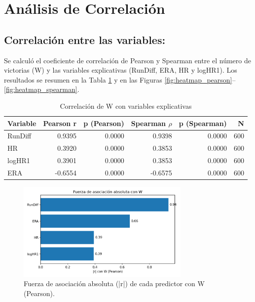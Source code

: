 \documentclass[10pt]{article}
\begin{document}
\section{Análisis de Correlación}
\subsection{Correlación entre las variables:}

Se calculó el coeficiente de correlación de Pearson y Spearman entre el número de victorias (W) y las variables explicativas 
(RunDiff, ERA, HR y logHR1). Los resultados se resumen en la Tabla \ref{tab:corr_w_x} y en las Figuras 
\ref{fig:heatmap_pearson}--\ref{fig:heatmap_spearman}.

\begin{table}[H]
    \centering
    \caption{Correlación de W con variables explicativas}
    \label{tab:corr_w_x}
    \begin{tabular}{lrrrrr}
    \toprule
    Variable & Pearson r & p (Pearson) & Spearman $\rho$ & p (Spearman) & N \\
    \midrule
    RunDiff & 0.9395 & 0.0000 & 0.9398 & 0.0000 & 600 \\
    HR & 0.3920 & 0.0000 & 0.3853 & 0.0000 & 600 \\
    logHR1 & 0.3901 & 0.0000 & 0.3853 & 0.0000 & 600 \\
    ERA & -0.6554 & 0.0000 & -0.6575 & 0.0000 & 600 \\
    \bottomrule
    \end{tabular}
\end{table}
    

\begin{figure}[H]
    \centering
    \includegraphics[width=0.75\textwidth]{../plots/bar_abs_r_W.png}
    \caption{Fuerza de asociación absoluta (|r|) de cada predictor con W (Pearson).}
    \label{fig:bar_abs_r}
\end{figure}
\end{document}
